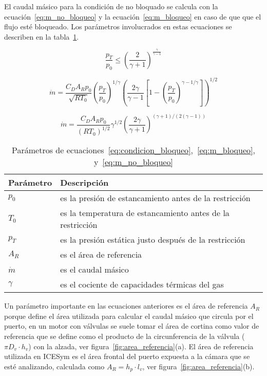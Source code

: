 El caudal másico para la condición de no bloquado se calcula con la
ecuación~\ref{eq:m_no_bloqueo} y la ecuación~\ref{eq:m_bloqueo} en caso de que
que el flujo esté bloqueado.
%
Los parámetros involucrados en estas ecuaciones se describen en la
tabla~\ref{tab:parametros_cd}.

\begin{equation}\label{eq:condicion_bloqueo}
  \frac{p_{T}}{p_{0}} \le {\left(\frac{2}{\gamma+1}\right)}^{\frac{\gamma}{\gamma - 1}}
\end{equation}

\begin{equation}
    \label{eq:m_no_bloqueo}
    \dot{m} = \frac{C_D A_R p_0}{\sqrt{R T_0}}
            {\left(\frac{p_T}{p_0} \right)}^{1/\gamma}
            {\left( \frac{2\gamma}{\gamma-1} \left[1- {\left(\frac{p_T}{p_0}\right)}^{{\gamma-1}/\gamma} \right] \right)}^{1/2}
\end{equation}

\begin{equation}\label{eq:m_bloqueo}
  \dot{m}=  \frac {C_D A_R p_0} {{(R T_0)}^{1/2}}
            \gamma^{1/2}
            {\left( \frac{2\gamma}{\gamma+1} \right)}^{(\gamma+1)/(2(\gamma-1))}
\end{equation}


\begin{table}
  \centering
  \begin{tabular}{ll}\toprule
    Parámetro & Descripción \\ \midrule
    $p_0$ & es la presión de estancamiento antes de la restricción \\
    $T_0$ & es la temperatura de estancamiento antes de la restricción \\
    $p_T$ & es la presión estática justo después de la restricción \\
    $A_R$ & es el área de referencia \\
    $\dot{m}$ & es el caudal másico \\
    $\gamma$ & es el cociente de capacidades térmicas del gas \\ \bottomrule
  \end{tabular}
  \caption{Parámetros de
ecuaciones~\ref{eq:condicion_bloqueo},~\ref{eq:m_bloqueo},
y~\ref{eq:m_no_bloqueo}}\label{tab:parametros_cd}
\end{table}


Un parámetro importante en las ecuaciones anteriores es el área de referencia
$A_{R}$ porque define el área utilizada para calcular el caudal másico que
circula por el puerto, en un motor con válvulas se suele tomar el área de
cortina como valor de referencia que se define como el producto de la
circunferencia de la válvula ($\pi D_{v} \cdot h_{v}$) con la alzada, ver
figura~\ref{fig:area_referencia}(a).
%
El área de referencia utilizada en ICESym es el área frontal del puerto expuesta
a la cámara que se esté analizando, calculada como $A_{R} = h_{p} \cdot l_{v}$, ver
figura~\ref{fig:area_referencia}(b).

